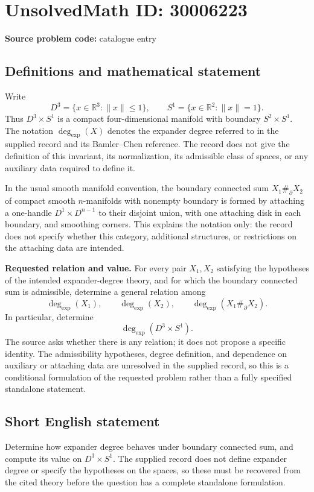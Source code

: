 \documentclass[11pt]{article}
\newcommand{\R}{\mathbb{R}}
\begin{document}
\section*{UnsolvedMath ID: 30006223}
\textbf{Source problem code:} catalogue entry
\subsection{Definitions and mathematical statement}
Write
\[
D^3=\{x\in\R^3:\|x\|\leq 1\},\qquad S^1=\{x\in\R^2:\|x\|=1\}.
\]
Thus \(D^3\times S^1\) is a compact four-dimensional manifold with boundary \(S^2\times S^1\). The notation \(\deg_{\mathrm{exp}}(X)\) denotes the expander degree referred to in the supplied record and its Bamler--Chen reference. The record does not give the definition of this invariant, its normalization, its admissible class of spaces, or any auxiliary data required to define it.

In the usual smooth manifold convention, the boundary connected sum \(X_1\mathbin{\#_\partial}X_2\) of compact smooth \(n\)-manifolds with nonempty boundary is formed by attaching a one-handle \(D^1\times D^{n-1}\) to their disjoint union, with one attaching disk in each boundary, and smoothing corners. This explains the notation only: the record does not specify whether this category, additional structures, or restrictions on the attaching data are intended.

\textbf{Requested relation and value.} For every pair \(X_1,X_2\) satisfying the hypotheses of the intended expander-degree theory, and for which the boundary connected sum is admissible, determine a general relation among
\[
\deg_{\mathrm{exp}}(X_1),\qquad
\deg_{\mathrm{exp}}(X_2),\qquad
\deg_{\mathrm{exp}}(X_1\mathbin{\#_\partial}X_2).
\]
In particular, determine
\[
\deg_{\mathrm{exp}}(D^3\times S^1).
\]
The source asks whether there is any relation; it does not propose a specific identity. The admissibility hypotheses, degree definition, and dependence on auxiliary or attaching data are unresolved in the supplied record, so this is a conditional formulation of the requested problem rather than a fully specified standalone statement.
\subsection{Short English statement}
Determine how expander degree behaves under boundary connected sum, and compute its value on \(D^3\times S^1\). The supplied record does not define expander degree or specify the hypotheses on the spaces, so these must be recovered from the cited theory before the question has a complete standalone formulation.
\end{document}
